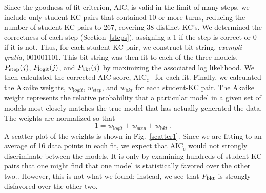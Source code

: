 \documentclass[11pt,letterpaper]{article}
\begin{document}
Since the goodness of fit criterion, AIC, is valid in the limit 
of many steps, we include only student-KC 
pairs that contained 10 or more turns, reducing the number of 
student-KC pairs to 267, covering 38 distinct KC's.
We determined the correctness of each step (Section~\ref{steps}),
assigning a 1 if the step is correct or 0 if it is not.
Thus, for each student-KC pair, we construct bit string, {\em exempli gratia},
001001101.  This bit string was then fit to each of the three models,
$P_{\rm step}(j)$, $P_{\rm logit}(j)$, and $P_{\rm bkt}(j)$ by
maximizing the associated log likelihood.  
We then calculated the corrected AIC score, AIC$_{\mathrm c}$~\cite{aicbook} 
for each fit.  
Finally, we calculated the Akaike weights, $w_{\mathrm logit}$,
$w_{\mathrm step}$, and $w_{\mathrm bkt}$ for each student-KC pair.  
The Akaike weight represents the relative probability that
a particular model in a given set of models most closely matches
the true model that has actually generated the data.
The weights are normalized so that 
%
\begin{equation}
   1=w_{\mathrm logit}+ w_{\mathrm step} + w_{\mathrm bkt} \; .
\end{equation}
A scatter plot of the weights is shown in Fig.~\ref{scatter1}.
Since we are fitting to an average of 16 data points in
each fit, we expect that AIC$_{\mathrm c}$ would not strongly
discriminate between the models.  It is only by examining
hundreds of student-KC pairs that one might find that
one model is statistically favored over the other two..  However, this is not what
we found; instead, we see that $P_{\rm bkt}$ is strongly disfavored 
over the other two.
\end{document}
